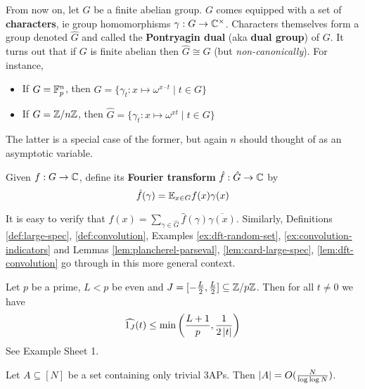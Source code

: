 \documentclass{article}
\begin{document}
From now on, let $G$ be a finite abelian group. $G$ comes equipped with a set of {\bf characters}, ie group homomorphisms $\gamma : G \to \mathbb C^\times$. Characters themselves form a group denoted $\hat G$ and called the {\bf Pontryagin dual} (aka {\bf dual group}) of $G$. It turns out that if $G$ is finite abelian then $\hat G \cong G$ (but {\it non-canonically}). For instance,
\begin{itemize}
  \item If $G = \mathbb F_p^n$, then $\hat G = \{\gamma_t : x \mapsto \omega^{x \cdot t} \mid t \in G\}$
  \item If $G = \mathbb Z/n\mathbb Z$, then $\hat G = \{\gamma_t : x \mapsto \omega^{xt} \mid t \in G\}$
\end{itemize}
The latter is a special case of the former, but again $n$ should thought of as an asymptotic variable.

\begin{ndef}
  Given $f : G \to \mathbb C$, define its {\bf Fourier transform} $\hat f : \hat G \to \mathbb C$ by
  $$\hat f(\gamma) = \mathbb E_{x \in G} f(x)\gamma(x)$$
\end{ndef}
It is easy to verify that $f(x) = \sum_{\gamma \in \hat G} \hat f(\gamma) \overline{\gamma(x)}$. Similarly, Definitions \ref{def:large-spec}, \ref{def:convolution}, Examples \ref{ex:dft-random-set}, \ref{ex:convolution-indicators} and Lemmas \ref{lem:plancherel-parseval}, \ref{lem:card-large-spec}, \ref{lem:dft-convolution} go through in this more general context.

\begin{nex}
  Let $p$ be a prime, $L < p$ be even and $J = [-\frac L2, \frac L2] \subseteq \mathbb Z/p\mathbb Z$. Then for all $t \ne 0$ we have
  $$\widehat{1_J}(t) \le \min\left(\frac{L + 1}p, \frac 1{2\left\lvert t\right\rvert}\right)$$
  See Example Sheet 1.
\end{nex}

\begin{nthm}[Roth]
  Let $A \subseteq [N]$ be a set containing only trivial 3APs. Then $\left\lvert A\right\rvert = O(\frac N{\log\log N})$.
\end{nthm}
\end{document}

